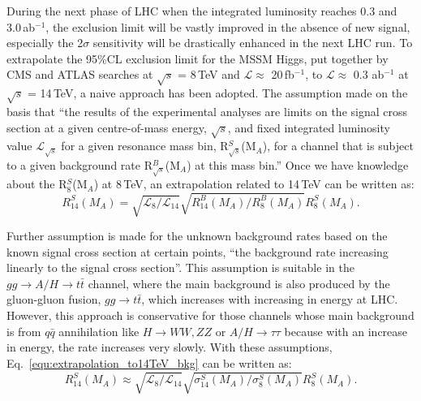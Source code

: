 During the next phase of LHC when the integrated luminosity reaches 0.3 and 3.0\,ab$^{-1}$, the exclusion limit will be vastly improved in the absence of new signal, especially the 2$\sigma$ sensitivity will be drastically enhanced in the next LHC run. To extrapolate the 95\%CL exclusion limit for the MSSM Higgs, put together by CMS and ATLAS searches at $\sqrt{s}$ = 8\,TeV and $\mathcal{L}\approx$ 20\,fb$^{-1}$, to $\mathcal{L}\approx$ 0.3 ab$^{-1}$ at $\sqrt{s}$ = 14\,TeV, a naive approach has been adopted. The assumption made on the basis that ``the results of the experimental analyses are limits on the signal cross section at a given centre-of-mass energy, $\sqrt{s}$, and fixed integrated luminosity value $\mathcal{L}_{\sqrt{s}}$ for a given resonance mass bin, R$^{S}_{\sqrt{s}}$(M$_{A}$), for a channel that is subject to a given background rate R$^{B}_{\sqrt{s}}$(M$_{A}$) at this mass bin.'' Once we have knowledge about the R$^{S}_{8}$(M$_{A}$) at 8\,TeV, an extrapolation related to 14\,TeV can be written as:
\begin{equation}\label{equ:extrapolation_to14TeV_bkg}
R^{S}_{14}(M_{A}) = \sqrt{\mathcal{L}_{8}/\mathcal{L}_{14}} \sqrt{R^{B}_{14}(M_{A})/R^{B}_{8}(M_{A})} R^{S}_{8}(M_{A}).
\end{equation}

Further assumption is made for the unknown background rates based on the known signal cross section at certain points, ``the background rate increasing linearly to the signal cross section''. This assumption is suitable in the $gg\rightarrow A/H\rightarrow t\bar t$ channel, where the main background is also produced by the gluon-gluon fusion, $gg\rightarrow t\bar t$, which increases with increasing in energy at LHC. However, this approach is conservative for those channels whose main background is from $q\bar q$ annihilation like $H\rightarrow WW, ZZ$ or $A/H\rightarrow\tau\tau$ because with an increase in energy, the rate increases very slowly. With these assumptions, Eq.~\ref{equ:extrapolation_to14TeV_bkg} can be written as:
\begin{equation}\label{equ:extrapolation_to14TeV_sig}
R^{S}_{14}(M_{A}) \approx \sqrt{\mathcal{L}_{8}/\mathcal{L}_{14}} \sqrt{\sigma^{S}_{14}(M_{A})/\sigma^{S}_{8}(M_{A})} R^{S}_{8}(M_{A}).
\end{equation}

